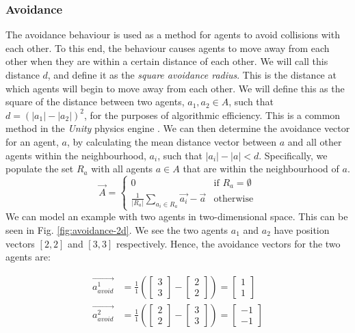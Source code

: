 \documentclass[12pt]{article}
\begin{document}
\subsubsection{Avoidance}
The avoidance behaviour is used as a method for agents to avoid collisions with each other. To this end, the behaviour causes agents to move away from each other when they are within a certain distance of each other. We will call this distance $d$, and define it as the \emph{square avoidance radius}. This is the distance at which agents will begin to move away from each other. We will define this as the square of the distance between two agents, $a_1,a_2 \in A$, such that $d = (|a_1|-|a_2|)^2$, for the purposes of algorithmic efficiency. This is a common method in the \emph{Unity} physics engine \cite{unity}. We can then determine the avoidance vector for an agent, $a$, by calculating the mean distance vector between $a$ and all other agents within the neighbourhood, $a_i$, such that $|a_i| - |a| < d$. Specifically, we populate the set $R_a$ with all agents $a \in A$ that are within the neighbourhood of $a$.
\begin{equation}
\vec{A} = 
\begin{cases}
    0 & \text{if } R_a = \emptyset \\
    \frac{1}{|R_a|} \sum_{a_i \in R_a} \vec{a_i} - \vec{a} & \text{otherwise}
\end{cases}
\end{equation}
We can model an example with two agents in two-dimensional space. This can be seen in Fig. \ref{fig:avoidance-2d}. We see the two agents $a_1$ and $a_2$ have position vectors $[2,2]$ and $[3,3]$ respectively. Hence, the avoidance vectors for the two agents are:

\begin{equation}
    \begin{aligned}
        \vec{a_{avoid}^1} &= \frac{1}{1} \left( \begin{bmatrix} 3 \\ 3 \end{bmatrix} - \begin{bmatrix} 2 \\ 2 \end{bmatrix} \right) = \begin{bmatrix} 1 \\ 1 \end{bmatrix} \\
        \vec{a_{avoid}^2} &= \frac{1}{1} \left( \begin{bmatrix} 2 \\ 2 \end{bmatrix} - \begin{bmatrix} 3 \\ 3 \end{bmatrix} \right) = \begin{bmatrix} -1 \\ -1 \end{bmatrix}
    \end{aligned}
\end{equation}
\end{document}
